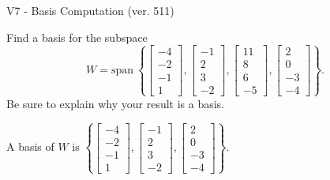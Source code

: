 \begin{exercise}
  \begin{exerciseTitle}V7 - Basis Computation (ver. 511)\end{exerciseTitle}
  \begin{exerciseStatement}
    Find a basis for the subspace 
\[W=\mathrm{span}\ \left\{\left[\begin{array}{r}
-4 \\
-2 \\
-1 \\
1
\end{array}\right] , \left[\begin{array}{r}
-1 \\
2 \\
3 \\
-2
\end{array}\right] , \left[\begin{array}{r}
11 \\
8 \\
6 \\
-5
\end{array}\right] , \left[\begin{array}{r}
2 \\
0 \\
-3 \\
-4
\end{array}\right]\right\}.\]
 Be sure to explain why your result is a basis.


  \end{exerciseStatement}
  \begin{exerciseAnswer}
   A basis of \(W\) is  \(\left\{\left[\begin{array}{r}
-4 \\
-2 \\
-1 \\
1
\end{array}\right] , \left[\begin{array}{r}
-1 \\
2 \\
3 \\
-2
\end{array}\right] , \left[\begin{array}{r}
2 \\
0 \\
-3 \\
-4
\end{array}\right]\right\}\).
  


  \end{exerciseAnswer}
\end{exercise}